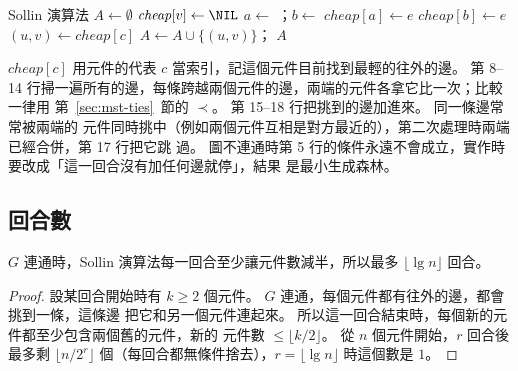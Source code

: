 \begin{pseudo}[label=alg:mst-sollin]{Sollin 演算法}
    \State $A \gets \emptyset$
        \State {}
    \EndFor
            \State $\mathit{cheap}[v] \gets \NIL$
        \EndFor
            \State $a \gets$ ；$b \gets$ 
                    \State $\mathit{cheap}[a] \gets e$
                \EndIf
                    \State $\mathit{cheap}[b] \gets e$
                \EndIf
            \EndIf
        \EndFor
            \State $(u, v) \gets \mathit{cheap}[c]$
             
                \State $A \gets A \cup \{(u, v)\}$；
            \EndIf
        \EndFor
    \EndWhile
    \State \Return $A$
\EndProcedure
\end{pseudo}

$\mathit{cheap}[c]$ 用元件的代表 $c$ 當索引，記這個元件目前找到最輕的往外的邊。 第 8--14
行掃一遍所有的邊，每條跨越兩個元件的邊，兩端的元件各拿它比一次；比較一律用
第~\ref{sec:mst-ties}~節的 $\prec$。 第 15--18 行把挑到的邊加進來。 同一條邊常常被兩端的
元件同時挑中（例如兩個元件互相是對方最近的），第二次處理時兩端已經合併，第 17 行把它跳
過。 圖不連通時第 5 行的條件永遠不會成立，實作時要改成「這一回合沒有加任何邊就停」，結果
是最小生成森林。

\subsection{回合數}

\begin{theorem}
\label{thm:mst-rounds}
$G$ 連通時，Sollin 演算法每一回合至少讓元件數減半，所以最多 $\lfloor \lg n \rfloor$ 回合。
\end{theorem}

\begin{proof}
設某回合開始時有 $k \ge 2$ 個元件。 $G$ 連通，每個元件都有往外的邊，都會挑到一條，這條邊
把它和另一個元件連起來。 所以這一回合結束時，每個新的元件都至少包含兩個舊的元件，新的
元件數 $\le \lfloor k/2 \rfloor$。 從 $n$ 個元件開始，$r$ 回合後最多剩 $\lfloor n / 2^r
\rfloor$ 個（每回合都無條件捨去），$r = \lfloor \lg n \rfloor$ 時這個數是 $1$。
\end{proof}

